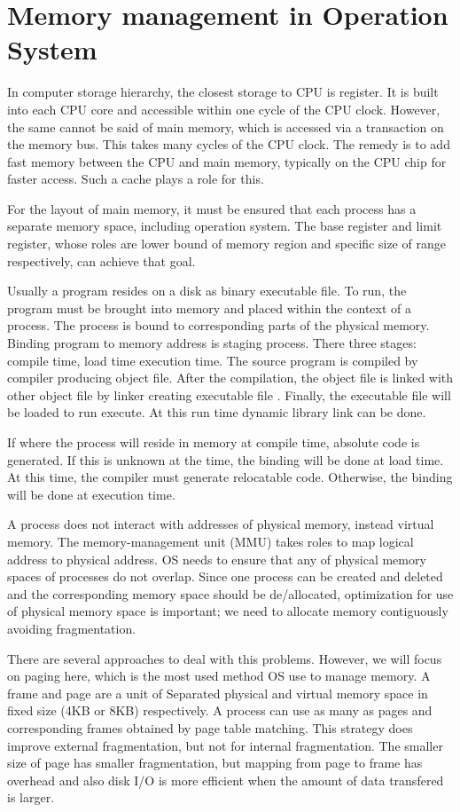 \section{Memory management in Operation System}
\label{sec:history}
In computer storage hierarchy, the closest storage to CPU is register. It is built into each CPU core and accessible within one cycle of the CPU clock.
However, the same cannot be said of main memory, which is accessed via a transaction on the memory bus. This takes many cycles of the CPU clock.
The remedy is to add fast memory between the CPU and main memory, typically on the CPU chip for faster access. Such a cache plays a role for this.

For the layout of main memory, it must be ensured that each process has a separate memory space, including operation system. 
The base register and limit register, whose roles are lower bound of memory region and specific size of range respectively, can achieve that goal. 

Usually a program resides on a disk as binary executable file. To run, the program must be brought into memory and placed within the context of a process.
The process is bound to corresponding parts of the physical memory. Binding program to memory address is staging process. 
There three stages: compile time, load time execution time. The source program is compiled by compiler producing object file. 
After the compilation, the object file is linked with other object file by linker creating executable file . 
Finally, the executable file will be loaded to run execute. At this run time dynamic library link can be done.

If where the process will reside in memory at compile time, absolute code is generated. If this is unknown at the time, 
the binding will be done at load time. At this time, the compiler must generate relocatable code. Otherwise, the binding will be done at 
execution time.

A process does not interact with addresses of physical memory, instead virtual memory. The memory-management unit (MMU) takes roles to map 
logical address to physical address. OS needs to ensure that any of physical memory spaces of processes do not overlap. 
Since one process can be created and deleted and the corresponding memory space should be de/allocated, 
optimization for use of physical memory space is important; we need to allocate memory contiguously avoiding fragmentation.

There are several approaches to deal with this problems. However, we will focus on paging here, which is the most used method OS use to manage memory.
A frame and page are a unit of Separated physical and virtual memory space in fixed size (4KB or 8KB) respectively.
A process can use as many as pages and corresponding frames obtained by page table matching. This strategy does improve external fragmentation, but not for internal fragmentation.
The smaller size of page has smaller fragmentation, but mapping from page to frame has overhead and also disk I/O is more efficient when the amount of data transfered is larger.



